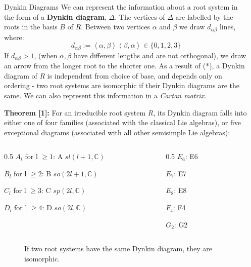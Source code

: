 \documentclass[final]{beamer}
\newlength{\sepwidth}
\newlength{\colwidth}
\newcommand{\separatorcolumn}{\begin{column}{\sepwidth}\end{column}}
\begin{document}
\begin{frame}[t]
\begin{columns}[t]
\begin{column}{\colwidth}
\begin{block}{Dynkin Diagrams}
We can represent the information about a root system in the form of a \textbf{Dynkin diagram}, $\Delta$. The vertices of $\Delta$ are labelled by the roots in the basis $B$ of $R$. Between two vertices $\alpha$ and $\beta$ we draw $d_{\alpha\beta}$ lines, where: 
\begin{equation} d_{\alpha\beta} := \left\langle \alpha,\beta \right\rangle\left\langle \beta,\alpha \right\rangle\in \{0,1,2,3\} \tag{using the Finiteness Lemma [1]}
\end{equation}
If $d_{\alpha\beta}>1$, (when $\alpha,\beta$ have different lengths and are not orthogonal), we draw an arrow from the longer root to the shorter one. As a result of (*), a Dynkin diagram of $R$ is independent from choice of base, and depends only on ordering - two root systems are isomorphic if their Dynkin diagrams are the same. We can also represent this information in a \emph{Cartan matrix}.

\textbf{Theorem [1]:} For an irreducible root system $R$, its Dynkin diagram falls into either one of four families (associated with the classical Lie algebras), or five exceptional diagrams (associated with all other semisimple Lie algebras):
\par
\begin{minipage}{\colwidth}
\begin{columns}[t]
\begin{column}{0.5\colwidth}
$A_{l}$ for l $\geq 1$: \dynkin A{} \quad $sl(l+1,\mathbb{C})$\par
$B_{l}$ for l $\geq 2$: \dynkin B{} \quad $so(2l+1,\mathbb{C})$\par
$C_{l}$ for l $\geq 3$: \dynkin C{} \quad $sp(2l,\mathbb{C})$\par
$D_{l}$ for l $\geq 4$: \dynkin D{} \quad $so(2l,\mathbb{C})$\par
\end{column}
\begin{column}{0.5\colwidth}
$E_{6}$: \dynkin E6 \par
$E_{7}$: \dynkin E7 \par
$E_{8}$: \dynkin E8 \par
$F_{4}$: \dynkin F4 \par
$G_{2}$: \dynkin G2 \par
\end{column}
\end{columns}
\end{minipage}
\begin{figure}
\raggedright{If two root systems have the same Dynkin diagram, they are isomorphic.}
\end{figure}
\end{block}
\end{column} 
\separatorcolumn


\end{columns}
\end{frame}
\end{document}

